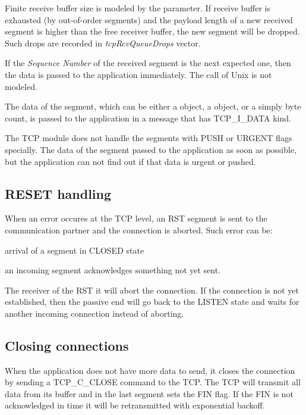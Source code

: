 Finite receive buffer size is modeled by the 
parameter. If receive buffer is exhausted (by out-of-order
segments) and the payload length of a new received segment
is higher than the free receiver buffer, the new segment will be dropped.
Such drops are recorded in \emph{tcpRcvQueueDrops} vector.

If the \emph{Sequence Number} of the received segment is the next
expected one, then the data is passed
to the application immediately. The  call of
Unix is not modeled.

The data of the segment, which can be either a 
object, a  object, or a simply byte count,
is passed to the application in a message that has
TCP\_I\_DATA kind.


\begin{note}
The TCP module does not handle the segments with PUSH or URGENT
flags specially. The data of the segment passed to the application
as soon as possible, but the application can not find out if that
data is urgent or pushed.
\end{note}

\subsection{RESET handling}

When an error occures at the TCP level, an RST segment is sent to
the communication partner and the connection is aborted.
Such error can be:
\begin{compactitem}
  \item arrival of a segment in CLOSED state
  \item an incoming segment acknowledges something not yet sent.
\end{compactitem}

The receiver of the RST it will abort the connection.
If the connection is not yet established, then the passive
end will go back to the LISTEN state and waits for another
incoming connection instead of aborting.

\subsection{Closing connections}

When the application does not have more data to send, it closes the
connection by sending a TCP\_C\_CLOSE command to the TCP. The TCP
will transmit all data from its buffer and in the last segment sets
the FIN flag. If the FIN is not acknowledged in time it will be
retransmitted with exponential backoff.

